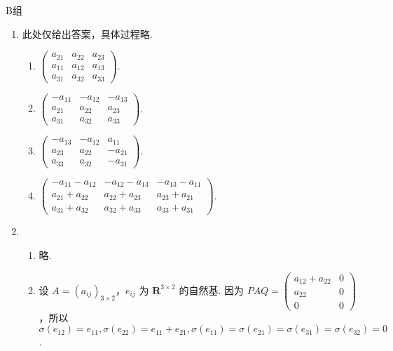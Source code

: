 \centerline{\heiti B组}
\begin{enumerate}
    \item 此处仅给出答案，具体过程略.
          \begin{enumerate}
              \item $\begin{pmatrix}a_{21} & a_{22} & a_{23} \\ a_{11} & a_{12} & a_{13} \\ a_{31} & a_{32} & a_{33}\end{pmatrix}$.

              \item $\begin{pmatrix}-a_{11} & -a_{12} & -a_{13} \\ a_{21} & a_{22} & a_{23} \\ a_{31} & a_{32} & a_{33}\end{pmatrix}$.

              \item $\begin{pmatrix}-a_{13} & -a_{12} & a_{11} \\ a_{23} & a_{22} & -a_{21} \\ a_{33} & a_{32} & -a_{31}\end{pmatrix}$.

              \item $\begin{pmatrix}-a_{11}-a_{12} & -a_{12}-a_{13} & -a_{13}-a_{11} \\ a_{21}+a_{22} & a_{22}+a_{23} & a_{23}+a_{21} \\ a_{31}+a_{32} & a_{32}+a_{33} & a_{33}+a_{31}\end{pmatrix}$.
          \end{enumerate}

    \item \begin{enumerate}
              \item 略.

              \item 设 $A=(a_{ij})_{3\times 2}$，$e_{ij}$ 为 $\mathbf{R}^{3\times 2}$ 的自然基. 因为 $PAQ = \begin{pmatrix}a_{12}+a_{22} & 0 \\ a_{22} & 0 \\ 0 & 0\end{pmatrix}$，所以 $\sigma(e_{12}) = e_{11},\sigma(e_{22}) = e_{11}+e_{21},\sigma(e_{11})=\sigma(e_{21})=\sigma(e_{31})=\sigma(e_{32})=0$.


\end{enumerate}
\end{enumerate}
